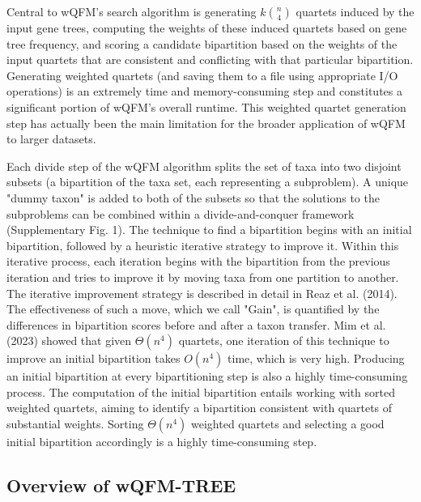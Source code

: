 \documentclass[11pt]{article}
\begin{document}
Central to wQFM's search algorithm is generating $k\binom{n}{4}$ quartets induced by the input gene trees, computing the weights of these induced quartets based on gene tree frequency, and scoring a candidate bipartition based on the weights of the input quartets that are consistent and conflicting with that particular bipartition. Generating weighted quartets (and saving them to a file using appropriate I/O operations) is an extremely time and memory-consuming step and constitutes a significant portion of wQFM's overall runtime. This weighted quartet generation step has actually been the main limitation for the broader application of wQFM to larger datasets.

Each divide step of the wQFM algorithm splits the set of taxa into two disjoint subsets (a bipartition of the taxa set, each representing a subproblem). A unique "dummy taxon" is added to both of the subsets so that the solutions to the subproblems can be combined within a divide-and-conquer framework (Supplementary Fig. 1). The technique to find a bipartition begins with an initial bipartition, followed by a heuristic iterative strategy to improve it. Within this iterative process, each iteration begins with the bipartition from the previous iteration and tries to improve it by moving taxa from one partition to another. The iterative improvement strategy is described in detail in Reaz et al. (2014). The effectiveness of such a move, which we call "Gain", is quantified by the differences in bipartition scores before and after a taxon transfer. Mim et al. (2023) showed that given $\Theta(n^4)$ quartets, one iteration of this technique to improve an initial bipartition takes $O(n^4)$ time, which is very high. Producing an initial bipartition at every bipartitioning step is also a highly time-consuming process. The computation of the initial bipartition entails working with sorted weighted quartets, aiming to identify a bipartition consistent with quartets of substantial weights. Sorting $\Theta(n^4)$ weighted quartets and selecting a good initial bipartition accordingly is a highly time-consuming step.

\subsection*{Overview of wQFM-TREE}
\end{document}
